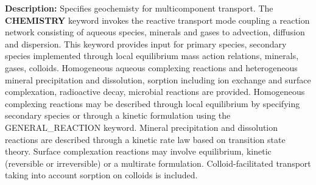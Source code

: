 \noindent
{\bf Description:}
Specifies geochemisty for multicomponent transport.
The {\bf CHEMISTRY} keyword invokes the reactive transport mode coupling a reaction network consisting of aqueous species, minerals and gases to advection, diffusion and dispersion. This keyword provides input for primary species, secondary species implemented through local equilibrium mass action relations, minerals, gases, colloids. Homogeneous aqueous complexing reactions and heterogeneous mineral precipitation and dissolution, sorption including ion exchange and surface complexation, radioactive decay, microbial reactions are provided. Homogeneous complexing reactions may be described through local equilibrium by specifying secondary species or through a kinetic formulation using the GENERAL\_REACTION keyword. Mineral precipitation and dissolution reactions are described through a kinetic rate law based on transition state theory. Surface complexation reactions may involve equilibrium, kinetic (reversible or irreversible) or a multirate formulation. Colloid-facilitated transport taking into account sorption on colloids is included.


